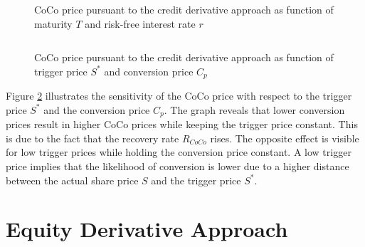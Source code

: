 \begin{figure}[H]
\centering
{}
    \caption[CoCo price pursuant to the credit derivative approach as function of maturity and interest rate]{CoCo price pursuant to the credit derivative approach as function of maturity $T$ and risk-free interest rate $r$}
  \label{fig:cd2}
  \end{figure}
$ $ \\
\begin{figure}[H]
\centering
    \caption[CoCo price pursuant to the credit derivative approach function of trigger price and conversion price]{CoCo price pursuant to the credit derivative approach as function of trigger price $S^*$ and conversion price $C_p$}
  \label{fig:cd3}
  \end{figure}

Figure \ref{fig:cd3} illustrates the sensitivity of the CoCo price with respect to the trigger price $S^*$ and the conversion price $C_p$. The graph reveals that lower conversion prices result in higher CoCo prices while keeping the trigger price constant. This is due to the fact that the recovery rate $R_{CoCo}$ rises. The opposite effect is visible for low trigger prices while holding the conversion price constant. A low trigger price implies that the likelihood of conversion is lower due to a higher distance between the actual share price $S$ and the trigger price $S^*$.

\section{Equity Derivative Approach}\label{sensiequity}

